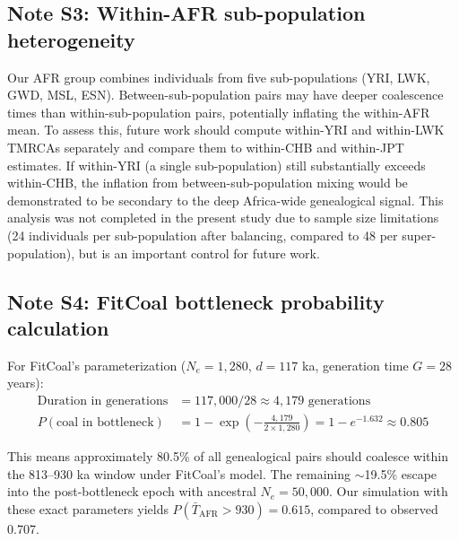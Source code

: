 \subsection*{Note S3: Within-AFR sub-population heterogeneity}

Our AFR group combines individuals from five sub-populations (YRI, LWK, GWD, MSL, ESN). Between-sub-population pairs may have deeper coalescence times than within-sub-population pairs, potentially inflating the within-AFR mean. To assess this, future work should compute within-YRI and within-LWK TMRCAs separately and compare them to within-CHB and within-JPT estimates. If within-YRI (a single sub-population) still substantially exceeds within-CHB, the inflation from between-sub-population mixing would be demonstrated to be secondary to the deep Africa-wide genealogical signal. This analysis was not completed in the present study due to sample size limitations (24 individuals per sub-population after balancing, compared to 48 per super-population), but is an important control for future work.

\subsection*{Note S4: FitCoal bottleneck probability calculation}

For FitCoal's parameterization ($N_e = 1{,}280$, $d = 117$ ka, generation time $G = 28$ years):
\begin{align}
\text{Duration in generations} &= 117{,}000 / 28 \approx 4{,}179\text{ generations} \\
P(\text{coal in bottleneck}) &= 1 - \exp\left(-\frac{4{,}179}{2 \times 1{,}280}\right) = 1 - e^{-1.632} \approx 0.805
\end{align}

This means approximately 80.5\% of all genealogical pairs should coalesce within the 813--930 ka window under FitCoal's model. The remaining $\sim$19.5\% escape into the post-bottleneck epoch with ancestral $N_e = 50{,}000$. Our simulation with these exact parameters yields $P(\bar{T}_\text{AFR} > 930) = 0.615$, compared to observed 0.707.
